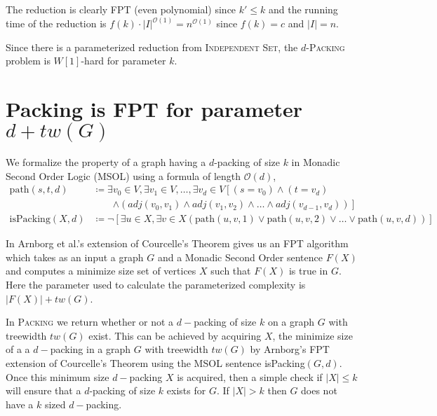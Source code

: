 \documentclass[12pt, a4paper]{article}
\theoremstyle{definition}
\newcommand{\mcO}{\mathcal{O}}
\begin{document}
The reduction is clearly FPT (even polynomial) since $k' \leq k$ and the running time of the reduction is $f(k) \cdot |I|^{\mcO(1)} = n^{\mcO(1)}$ since $f(k)=c$ and $|I| = n$.

Since there is a parameterized reduction from \textsc{Independent Set}, the $d$-\textsc{Packing} problem is $W[1]$-hard for parameter $k$. 

\section{\sc Packing \textnormal{is FPT for parameter $d + tw(G)$}}

We formalize the property of a graph having a $d$-packing of size $k$ in Monadic Second Order Logic (MSOL) using a formula of length $\mcO(d)$,
\begin{align*}
	\mathrm{path}(s, t, d) 		&\coloneqq \exists v_0 \in V, \exists v_1 \in V, \dotsc, \exists v_d \in V
									\left [ (s=v_0) \wedge (t=v_d) \right.\nonumber \\
								&\qquad \left. \wedge (adj(v_0, v_1) \wedge adj(v_1, v_2) 
									\wedge \dots \wedge adj(v_{d-1}, v_d)) \right ] \\
	\mathrm{isPacking}(X, d)	&\coloneqq \neg \left [\exists u \in X, \exists v \in X (\mathrm{path}(u, v, 1) 
									\vee \mathrm{path}(u, v, 2) \vee \dots \vee \mathrm{path}(u, v, d) ) \right ]
\end{align*}

In Arnborg et al.'s \cite{Arnborg1991} extension of Courcelle's Theorem gives us an FPT algorithm which takes as an input a graph $G$ and a Monadic Second Order sentence $F(X)$ and computes a minimize size set of vertices $X$ such that $F(X)$ is true in $G$. Here the parameter used to calculate the parameterized complexity is $|F(X)| + tw(G)$. 

In \textsc{Packing} we return whether or not a $d-$packing of size $k$ on a graph $G$ with treewidth $tw(G)$ exist. This can be achieved by acquiring $X$, the minimize size of a a $d-$packing in a graph $G$ with treewidth $tw(G)$ by Arnborg's FPT extension of Courcelle's Theorem using the MSOL sentence isPacking$(G,d)$. Once this minimum size $d-$packing $X$ is acquired, then a simple check if $|X| \leq k$ will ensure that a $d$-packing of size $k$ exists for $G$. If $|X| > k$ then $G$ does not have a $k$ sized $d-$packing.

\end{document}
